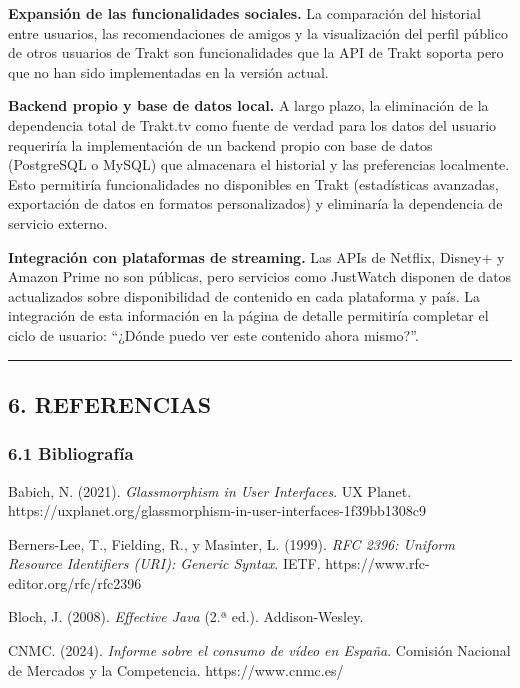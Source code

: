 \documentclass[
]{article}
\begin{document}
\textbf{Expansión de las funcionalidades sociales.} La comparación del
historial entre usuarios, las recomendaciones de amigos y la
visualización del perfil público de otros usuarios de Trakt son
funcionalidades que la API de Trakt soporta pero que no han sido
implementadas en la versión actual.

\textbf{Backend propio y base de datos local.} A largo plazo, la
eliminación de la dependencia total de Trakt.tv como fuente de verdad
para los datos del usuario requeriría la implementación de un backend
propio con base de datos (PostgreSQL o MySQL) que almacenara el
historial y las preferencias localmente. Esto permitiría funcionalidades
no disponibles en Trakt (estadísticas avanzadas, exportación de datos en
formatos personalizados) y eliminaría la dependencia de servicio
externo.

\textbf{Integración con plataformas de streaming.} Las APIs de Netflix,
Disney+ y Amazon Prime no son públicas, pero servicios como JustWatch
disponen de datos actualizados sobre disponibilidad de contenido en cada
plataforma y país. La integración de esta información en la página de
detalle permitiría completar el ciclo de usuario: ``¿Dónde puedo ver
este contenido ahora mismo?''.

\begin{center}\rule{0.5\linewidth}{0.5pt}\end{center}

\hypertarget{referencias}{%
\subsection{6. REFERENCIAS}\label{referencias}}

\hypertarget{bibliografuxeda}{%
\subsubsection{6.1 Bibliografía}\label{bibliografuxeda}}

Babich, N. (2021). \emph{Glassmorphism in User Interfaces}. UX Planet.
https://uxplanet.org/glassmorphism-in-user-interfaces-1f39bb1308c9

Berners-Lee, T., Fielding, R., y Masinter, L. (1999). \emph{RFC 2396:
Uniform Resource Identifiers (URI): Generic Syntax}. IETF.
https://www.rfc-editor.org/rfc/rfc2396

Bloch, J. (2008). \emph{Effective Java} (2.ª ed.). Addison-Wesley.

CNMC. (2024). \emph{Informe sobre el consumo de vídeo en España}.
Comisión Nacional de Mercados y la Competencia. https://www.cnmc.es/
\end{document}
